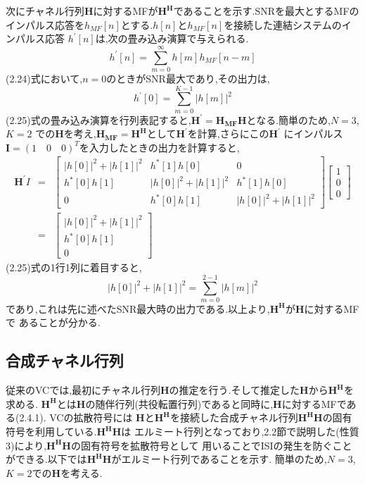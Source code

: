 次にチャネル行列$\bm{H}$に対するMFが$\bm{H^H}$であることを示す.SNRを最大とするMFの
インパルス応答を$h_{MF}[n]$とする.$h[n]$と$h_{MF}[n]$を接続した連結システムのインパルス応答
$h^{\prime}[n]$は,次の畳み込み演算で与えられる.
\begin{equation}
    h^{\prime}[n] = \sum_{m=0}^{\infty} h[m]h_{MF}[n-m]
\end{equation}
(2.24)式において,$n=0$のときがSNR最大であり,その出力は,
\begin{equation}
    h^{\prime}[0] = \sum_{m=0}^{K-1} |h[m]|^2
\end{equation}
(2.25)式の畳み込み演算を行列表記すると,$\bm{H^{\prime}}=\bm{H_{MF}H}$となる.簡単のため,$N=3$,$K=2$
での$\bm{H}$を考え,$\bm{H_{MF}=\bm{H^H}}$として$\bm{H^{\prime}}$を計算,さらにこの$\bm{H^{\prime}}$
にインパルス$\bm{I}=(1 \quad 0 \quad 0)^T$を入力したときの出力を計算すると,
\begin{eqnarray}
    \bm{H^{\prime}}I &=& \left[
        \begin{array}{ccc}
            |h[0]|^2+|h[1]|^2 & h^*[1]h[0] & 0 \\
            h^*[0]h[1] & |h[0]|^2+|h[1]|^2 & h^*[1]h[0] \\
            0 & h^*[0]h[1] & |h[0]|^2+|h[1]|^2
        \end{array}
    \right]
    \left[
        \begin{array}{c}
            1 \\
            0 \\
            0
        \end{array} 
    \right] \nonumber \\
    &=& \left[
        \begin{array}{c}
            |h[0]|^2+|h[1]|^2 \\
            h^*[0]h[1] \\
            0
        \end{array}
    \right]
\end{eqnarray}
(2.25)式の1行1列に着目すると,
\begin{equation}
    |h[0]|^2+|h[1]|^2 = \sum_{m=0}^{2-1} |h[m]|^2 \nonumber
\end{equation}
であり,これは先に述べたSNR最大時の出力である.以上より,$\bm{H^H}$が$\bm{H}$に対するMFで
あることが分かる.

\subsection{合成チャネル行列}
従来のVCでは,最初にチャネル行列$\bm{H}$の推定を行う.そして推定した$\bm{H}$から$\bm{H^H}$を求める.
$\bm{H^H}$とは$\bm{H}$の随伴行列(共役転置行列)であると同時に,$\bm{H}$に対するMFである(2.4.1).
VCの拡散符号には
$\bm{H}$と$\bm{H^H}$を接続した合成チャネル行列$\bm{H^HH}$の固有符号を利用している.$\bm{H^HH}$は
エルミート行列となっており,2.2節で説明した(性質3)により,$\bm{H^HH}$の固有符号を拡散符号として
用いることでISIの発生を防ぐことができる.以下では$\bm{H^HH}$がエルミート行列であることを示す.
簡単のため,$N=3$,$K=2$での$\bm{H}$を考える.

